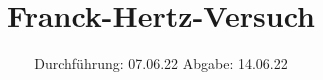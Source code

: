 

\subject{V601}
\title{Franck-Hertz-Versuch}
\date{
  Durchführung: 07.06.22
  \hspace{3em}
  Abgabe: 14.06.22
}



\maketitle
\thispagestyle{empty}
\tableofcontents
\newpage









\newpage
\printbibliography{}
\nocite{matplotlib}
\nocite{numpy}
\nocite{scipy}
\nocite{uncertainties}
\nocite{reback2020pandas}

\newpage



